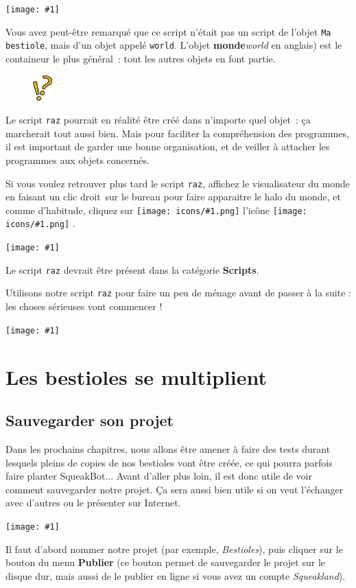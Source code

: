 \documentclass[a4paper,12pt]{book}
\def\appName{SqueakBot}
\def\cd{clic droit~}
\newcommand{\capture}[1]
{
\begin{center}
	\texttt{[image: \#1]}
\end{center}
}
\newcommand{\code}[1]{\texttt{#1}}
\newcommand{\important}[1]{\textbf{#1}}
\newcommand{\motcle}[2]{\important{\gls{#1}}}
\newcommand{\inserticon}[1]
{
\texttt{[image: icons/\#1.png]}
}
\newcommand{\icon}[2][]
{
\ifthenelse {\equal{#1} {}} {\inserticon{#2}} {l'icône \inserticon{#2} \important{#1}}
}
\newcommand{\astuce}[1]
{
\begin{framed}
\begin{figure}
	\vspace{-15pt}
	\includegraphics[width=2.0em]{astuce.png}
\end{figure}
#1
\end{framed}
}
\let\myMargin\marginpar
\renewcommand{\marginpar}[1]{\myMargin{{\scriptsize \sffamily #1}}}
\begin{document}
\capture{29.png}

Vous avez peut-être remarqué que ce script n'était pas un script de l'objet
\code{Ma bestiole}, mais d'un objet appelé \code{world}. L'objet \motcle{monde}
(\textit{world} en anglais) est le containeur le plus général~: tout les autres
objets en font partie.

\astuce{Le script \code{raz} pourrait en réalité être créé dans n'importe quel
objet~: ça marcherait tout aussi bien. Mais pour faciliter la compréhension des
programmes, il est important de garder une bonne organisation, et de veiller à
attacher les programmes aux objets concernés.}

Si vous voulez retrouver plus tard le script \code{raz}, affichez le
visualisateur du monde en faisant un \cd sur le bureau pour faire apparaitre le
halo du monde, et comme d'habitude, cliquez sur \icon{oeil}.  \capture{27.png}
Le script \code{raz} devrait être présent dans la catégorie \important{Scripts}.

Utilisons notre script \code{raz} pour faire un peu de ménage avant de passer à
la suite : les choses sérieuses vont commencer !

\capture{bestioles2.png}

\chapter{Les bestioles se multiplient}

\section{Sauvegarder son projet}

Dans les prochains chapitres, nous allons être amener à faire des tests durant
lesquels pleins de \og copies \fg de nos bestioles vont être créée, ce qui
pourra parfois faire \og planter \fg \appName... Avant d'aller plus loin, il
est donc utile de voir comment sauvegarder notre projet. Ça sera aussi bien
utile si on veut l'échanger avec d'autres ou le présenter sur Internet.

\capture{46bis.png}

Il faut d'abord nommer notre projet (par exemple, \textit{Bestioles}), puis
cliquer sur le bouton du menu \important{Publier} (ce bouton permet de
sauvegarder le projet sur le disque dur, mais aussi de le publier en ligne si
vous avez un compte \textit{Squeakland}).
\end{document}
